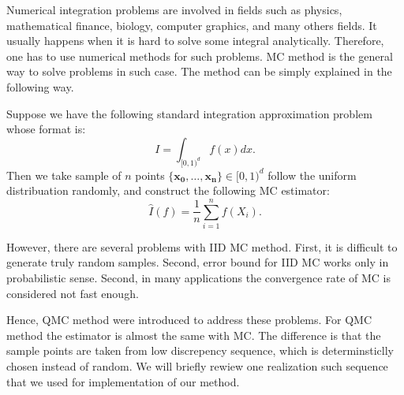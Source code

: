 
Numerical integration problems are involved in fields such as physics, mathematical finance, biology, computer graphics, and many others fields. 
It usually happens when it is hard to solve some integral analytically. Therefore, one has to use numerical methods for such problems.  
MC method is the general way to solve problems in such case\cite{fishman2013monte}. The method can be simply explained in the following way. 

Suppose we have the following standard integration approximation problem whose format is: 
\begin{equation}
    \label{eq:setup}
    I= \int_{[0,1)^d}f(x)dx.
\end{equation}
Then we take sample of $n$ points $\{\mathbf{x_0},\dots, \mathbf{x_n}\}\in [0,1)^d$ follow the uniform distribuation randomly, and construct the following MC estimator:
\[
\hat{I}(f)=\frac{1}{n}\sum_{i=1}^{n}f(X_i).
\]

However, there are several problems with IID MC method\cite{niederreiter2010quasi}.
First, it is difficult to generate truly random samples. Second, error bound for IID MC works only in probabilistic sense. 
Second, in many applications the convergence rate of MC is considered not fast enough. 

Hence, QMC method were introduced to address these problems. 
For QMC method the estimator is almost the same with MC. 
The difference is that the sample points are taken from low discrepency sequence, which is determinsticlly chosen instead of random.   
We will briefly rewiew one realization such sequence that we used for implementation of our method. 

\newpage


